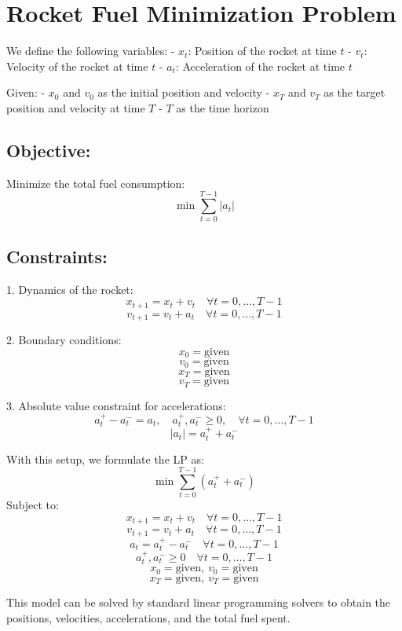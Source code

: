 \documentclass{article}
\begin{document}
\section*{Rocket Fuel Minimization Problem}

We define the following variables:
- \( x_t \): Position of the rocket at time \( t \)
- \( v_t \): Velocity of the rocket at time \( t \)
- \( a_t \): Acceleration of the rocket at time \( t \)

Given:
- \( x_0 \) and \( v_0 \) as the initial position and velocity
- \( x_T \) and \( v_T \) as the target position and velocity at time \( T \)
- \( T \) as the time horizon

\subsection*{Objective:}
Minimize the total fuel consumption:
\[
\min \sum_{t=0}^{T-1} |a_t|
\]

\subsection*{Constraints:}

1. Dynamics of the rocket:
   \[
   x_{t+1} = x_t + v_t \quad \forall t = 0, \ldots, T-1
   \]
   \[
   v_{t+1} = v_t + a_t \quad \forall t = 0, \ldots, T-1
   \]

2. Boundary conditions:
   \[
   x_0 = \text{given}
   \]
   \[
   v_0 = \text{given}
   \]
   \[
   x_T = \text{given}
   \]
   \[
   v_T = \text{given}
   \]

3. Absolute value constraint for accelerations:
   \[
   a_t^+ - a_t^- = a_t, \quad a_t^+, a_t^- \geq 0, \quad \forall t = 0, \ldots, T-1
   \]
   \[
   |a_t| = a_t^+ + a_t^-
   \]

With this setup, we formulate the LP as:
\[
\min \sum_{t=0}^{T-1} (a_t^+ + a_t^-)
\]
Subject to:
\[
x_{t+1} = x_t + v_t \quad \forall t = 0, \ldots, T-1
\]
\[
v_{t+1} = v_t + a_t \quad \forall t = 0, \ldots, T-1
\]
\[
a_t = a_t^+ - a_t^- \quad \forall t = 0, \ldots, T-1
\]
\[
a_t^+, a_t^- \geq 0 \quad \forall t = 0, \ldots, T-1
\]
\[
x_0 = \text{given}, \ v_0 = \text{given}
\]
\[
x_T = \text{given}, \ v_T = \text{given}
\]

This model can be solved by standard linear programming solvers to obtain the positions, velocities, accelerations, and the total fuel spent.
\end{document}
